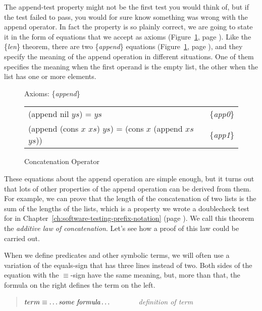 The append-test property might not be the first test you would think of,
but if the test failed to pass,
you would for sure know something was wrong with the append operator.
In fact the property is so plainly correct,
we are going to state it in the form of equations that we accept as axioms
(Figure~\ref{append-equations}, page \pageref{append-equations}).
Like the \{\emph{len}\} theorem, there are two \{\emph{append}\} equations
(Figure~\ref{append-equations}, page \pageref{append-equations}),
and they specify the meaning of the append operation in different situations.
One of them specifies the meaning when the first operand is the empty list,
the other when the list has one or more elements.

\begin{figure}
\begin{center}
Axioms: \{\emph{append}\} \\
\begin{tabular}{ll}
(append nil $ys$) =  $ys$                                     & \{\emph{app0}\} \\
(append (cons $x$ $xs$) $ys$) = (cons $x$ (append $xs$ $ys$)) & \{\emph{app1}\} \\
\end{tabular}
\end{center}
\caption{Concatenation Operator}
\label{append-equations}
\end{figure}

These equations about the append operation are simple enough,
but it turns out that lots of other properties of the
append operation can be derived from them.
For example, we can prove that the length of
the concatenation of two lists is the sum of the lengths of the lists,
which is a property we wrote a doublecheck test for in
Chapter~\ref{ch:software-testing-prefix-notation} (page \pageref{additive-lengths-test}).
We call this theorem the \emph{additive law of concatenation}.
Let's see how a proof of this law could be carried out.

\begin{aside}
When we define predicates and other symbolic terms,
we will often use a variation of the equals-sign
that has three lines instead of two.
Both sides of the equation with the  $\equiv$-sign have the same meaning,
but, more than that, the formula on the right defines the term on the left.
\begin{quote}
$term \equiv \dots \emph{some formula} \dots$ ~~~~~~~\emph{definition of term}
\end{quote}
\caption{``$\equiv$'' Means ``Equals by Definition''}
\label{three-line-equal}
\end{aside}

